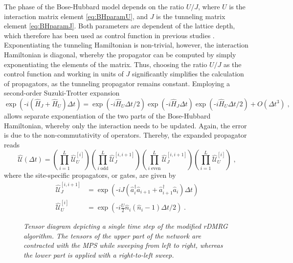 The phase of the Bose-Hubbard model depends on the ratio $U/J$, where $U$ is the interaction matrix element \eqref{eq:BHparamU}, and $J$ is the tunneling matrix element \eqref{eq:BHparamJ}. Both parameters are dependent of the lattice depth, which therefore has been used as control function in previous studies \cite{FrankBloch,Doria2011}. Exponentiating the tunneling Hamiltonian is non-trivial, however, the interaction Hamiltonian is diagonal, whereby the propagator can be computed by simply exponentiating the elements of the matrix. Thus, choosing the ratio $U/J$ as the control function and working in units of $J$ significantly simplifies the calculation of propagators, as the tunneling propagator remains constant. Employing a second-order Suzuki-Trotter expansion
\begin{equation}
	\exp\left( \text{-}i ( \hat{H}_J + \hat{H}_U  ) \Delta t \right) = \exp\left( \text{-} i \hat{H}_U \Delta t /2  \right) \exp\left( \text{-} i \hat{H}_J \Delta  t \right) \exp\left( \text{-} i \hat{H}_U \Delta t /2  \right) + O(\Delta t^3) \; ,
	\label{eq:SuzukiTrotter}
\end{equation}
allows separate exponentiation of the two parts of the Bose-Hubbard Hamiltonian, whereby only the interaction needs to be updated. Again, the error is due to the non-commutativity of operators. Thereby, the expanded propagator reads
\begin{equation}
	\hat{\mathcal{U}} (\Delta t) = \left( \prod_{i = 1}^{L} \hat{\mathcal{U}}_{U}^{[i]} \right) \left( \prod_{i \; \mathrm{odd}}^{L} \hat{\mathcal{U}}_{J}^{[i,i+1]}  \right) \left( \prod_{i \; \mathrm{even}}^{L} \hat{\mathcal{U}}_{J}^{[i,i+1]}  \right) \left( \prod_{i = 1}^{L} \hat{\mathcal{U}}_{U}^{[i]} \right) \; ,
\end{equation}
where the site-specific propagators, or gates, are given by
\begin{align}
	\hat{\mathcal{U}}_{J}^{[i,i+1]} &= \exp \left( \text{-} i J ( \hat{a}_{i}^{\dag} \hat{a}_{i+1} + \hat{a}_{i+1}^{\dag} \hat{a}_{i} ) \Delta t \right) \\
	\hat{\mathcal{U}}_{U}^{[i]} &= \exp \left( \text{-} i \frac{U}{2} \hat{n}_i (\hat{n}_i -1) \Delta t /2 \right) \; .
\end{align}
\begin{figure}[h!]
	\centering
	
	\caption{\textit{Tensor diagram depicting a single time step of the modified rDMRG algorithm. The tensors of the upper part of the network are contracted with the MPS while sweeping from left to right, whereas the lower part is applied with a right-to-left sweep.}}
	\label{fig:ModifiedTEBD}
\end{figure}
